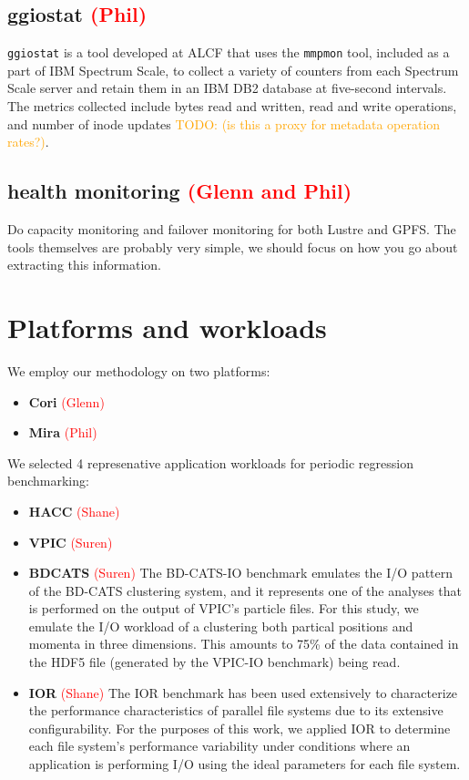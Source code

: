 \documentclass[conference,10pt,compsocconf]{IEEEtran}
\newcommand{\assign}[1]{\textcolor{red}{(#1)}}
\newcommand{\todo}[1]{\textcolor{Orange}{TODO: #1}}
\begin{document}
\subsection{ggiostat \assign{Phil}}

\texttt{ggiostat} is a tool developed at ALCF that uses the \texttt{mmpmon}
tool, included as a part of IBM Spectrum Scale, to collect a variety of counters
from each Spectrum Scale server and retain them in an IBM DB2 database at
five-second intervals.  The metrics collected include bytes read and written,
read and write operations, and number of inode updates \todo{(is this
a proxy for metadata operation rates?)}.

\subsection{health monitoring \assign{Glenn and Phil}}

Do capacity monitoring and failover monitoring for both Lustre and GPFS.  The
tools themselves are probably very simple, we should focus on how you go
about extracting this information.

\section{Platforms and workloads} \label{platforms}

We employ our methodology on two platforms:

\begin{itemize}
\item \textbf{Cori} \assign{Glenn}
\item \textbf{Mira} \assign{Phil}
\end{itemize}

We selected 4 represenative application workloads for periodic regression
benchmarking:

\begin{itemize}
\item \textbf{HACC} \assign{Shane}
\item \textbf{VPIC} \assign{Suren} \cite{Bowers2008}
\item \textbf{BDCATS} \assign{Suren} The BD-CATS-IO benchmark emulates the I/O
pattern of the BD-CATS clustering system\cite{Patwary2015}, and it represents
one of the analyses that is performed on the output of VPIC's particle files.
For this study, we emulate the I/O workload of a clustering both partical
positions and momenta in three dimensions.  This amounts to 75\% of the data
contained in the HDF5 file (generated by the VPIC-IO benchmark) being read.
\item \textbf{IOR} \assign{Shane} The IOR benchmark has been used extensively
to characterize the performance characteristics of parallel file systems\cite{Yildiz2016,Xie2012,Lofstead2010,Uselton2010}
due to its extensive configurability.  For the purposes of this work, we applied
IOR to determine each file system's performance variability under conditions
where an application is performing I/O using the ideal parameters for each
file system.

\end{itemize}
\end{document}
